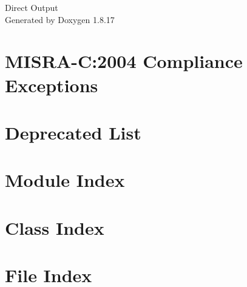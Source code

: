 \let\mypdfximage\pdfximage\def\pdfximage{\immediate\mypdfximage}\documentclass[twoside]{book}
\newcommand{\+}{\discretionary{\mbox{\scriptsize$\hookleftarrow$}}{}{}}
\newcommand{\clearemptydoublepage}{%
  \newpage{\pagestyle{empty}\cleardoublepage}%
}
\begin{document}
\hypersetup{pageanchor=false,
             bookmarksnumbered=true,
             pdfencoding=unicode
            }
\begin{titlepage}
\vspace*{7cm}
\begin{center}%
{\Large Direct Output }\\
\vspace*{1cm}
{\large Generated by Doxygen 1.8.17}\\
\end{center}
\end{titlepage}
\clearemptydoublepage
{}
\tableofcontents
\clearemptydoublepage
{}
\hypersetup{pageanchor=true}

\chapter{M\+I\+S\+R\+A-\/C\+:2004 Compliance Exceptions}
\label{CMSIS_MISRA_Exceptions}

\chapter{Deprecated List}
\label{deprecated}

\chapter{Module Index}

\chapter{Class Index}

\chapter{File Index}

\end{document}
